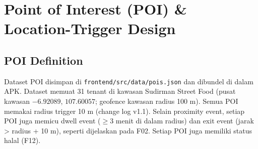 \chapter{Point of Interest (POI) \& Location-Trigger Design}
\label{bab:point-of-interest-poi-location-trigger-design}
\section{POI Definition}

Dataset POI disimpan di \texttt{frontend/src/data/pois.json} dan dibundel di dalam APK. Dataset memuat 31 tenant di kawasan Sudirman Street Food (pusat kawasan $-6.92089$, $107.60057$; geofence kawasan radius 100 m). Semua POI memakai radius trigger 10 m (change log v1.1). Selain proximity event, setiap POI juga memicu dwell event (\(\ge\)3 menit di dalam radius) dan exit event (jarak \textgreater{} radius + 10 m), seperti dijelaskan pada F02. Setiap POI juga memiliki status halal (F12).

